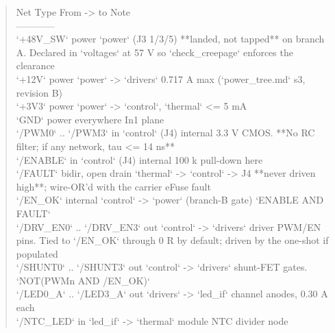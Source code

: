 \documentclass[11pt,a4paper]{article}
\begin{document}
\begin{quote}\small\ttfamily\raggedright
\textbar{} Net \textbar{} Type \textbar{} From -\textgreater{} to \textbar{} Note \textbar{}\\
\textbar{}---\textbar{}---\textbar{}---\textbar{}---\textbar{}\\
\textbar{} `+48V\_SW` \textbar{} power \textbar{} `power` (J3 1/3/5) \textbar{} {*}{*}landed, not tapped{*}{*} on branch A. Declared in `voltages` at 57 V so `check\_creepage` enforces the clearance \textbar{}\\
\textbar{} `+12V` \textbar{} power \textbar{} `power` -\textgreater{} `drivers` \textbar{} 0.717 A max (`power\_tree.md` s3, revision B) \textbar{}\\
\textbar{} `+3V3` \textbar{} power \textbar{} `power` -\textgreater{} `control`, `thermal` \textbar{} \textless{}= 5 mA \textbar{}\\
\textbar{} `GND` \textbar{} power \textbar{} everywhere \textbar{} In1 plane \textbar{}\\
\textbar{} `/PWM0` .. `/PWM3` \textbar{} in \textbar{} `control` (J4) internal \textbar{} 3.3 V CMOS. {*}{*}No RC filter; if any network, tau \textless{}= 14 ns{*}{*} \textbar{}\\
\textbar{} `/ENABLE` \textbar{} in \textbar{} `control` (J4) internal \textbar{} 100 k pull-down here \textbar{}\\
\textbar{} `/FAULT` \textbar{} bidir, open drain \textbar{} `thermal` -\textgreater{} `control` -\textgreater{} J4 \textbar{} {*}{*}never driven high{*}{*}; wire-OR'd with the carrier eFuse fault \textbar{}\\
\textbar{} `/EN\_OK` \textbar{} internal \textbar{} `control` -\textgreater{} `power` (branch-B gate) \textbar{} `ENABLE AND FAULT` \textbar{}\\
\textbar{} `/DRV\_EN0` .. `/DRV\_EN3` \textbar{} out \textbar{} `control` -\textgreater{} `drivers` \textbar{} driver PWM/EN pins. Tied to `/EN\_OK` through 0 R by default; driven by the one-shot if populated \textbar{}\\
\textbar{} `/SHUNT0` .. `/SHUNT3` \textbar{} out \textbar{} `control` -\textgreater{} `drivers` \textbar{} shunt-FET gates. `NOT(PWMn AND /EN\_OK)` \textbar{}\\
\textbar{} `/LED0\_A` .. `/LED3\_A` \textbar{} out \textbar{} `drivers` -\textgreater{} `led\_if` \textbar{} channel anodes, 0.30 A each \textbar{}\\
\textbar{} `/NTC\_LED` \textbar{} in \textbar{} `led\_if` -\textgreater{} `thermal` \textbar{} module NTC divider node \textbar{}\\

\end{quote}
\end{document}
